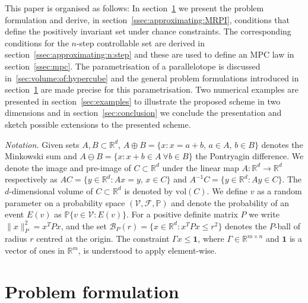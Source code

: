 \documentclass{ifacconf}
\providecommand{\vol}{\text{vol}}
\providecommand{\B}{\mathcal B}
\providecommand{\F}{\mathscr F}
\providecommand{\V}{\mathcal V}
\providecommand{\PP}{\mathbb P}
\providecommand{\RR}{\mathbb R}
\providecommand{\bfa}[1]{\mathbf{#1}}
\begin{document}
%
This paper is organised  as follows:
In section~\ref{sec:setup} we present the problem formulation and derive, in section~\ref{ssec:approximating:MRPI}, conditions that define the positively invariant set under chance constraints. The corresponding conditions for the $n$-step controllable set are derived in section~\ref{ssec:approximating:n:step} and these are used to define an MPC law in section~\ref{ssec:mpc}.
%
The parametrisation of a parallelotope is discussed in~\ref{sec:volume:of:hypercube} and the general problem formulations introduced in section~\ref{sec:setup} are made precise for this parametrisation.
%
Two numerical examples are presented in section~\ref{sec:examples} to illustrate the proposed scheme in two dimensions and in section~\ref{sec:conclusion} we conclude the presentation and sketch possible extensions to the presented scheme.

\textit{Notation.} Given sets $A,B\subset\RR^d$, $A\oplus B = \{x:x=a+b,\, a\in A,\, b\in B\}$ denotes the Minkowski sum and $A\ominus B = \{x: x+b \in A \ \forall b\in B\}$ the Pontryagin difference. We denote the image and pre-image of $C\subset\RR^d$ under the linear map $A:\RR^d\rightarrow\RR^d$ respectively as $AC = \{y\in\RR^d:Ax=y,\, x\in C\}$ and $A^{-1}C = \{y\in\RR^d:Ay\in C\}$. The $d$-dimensional volume of $C\subset\RR^d$ is denoted by $\vol(C)$. 
%
We define $v$ as a random parameter on a probability space $(\V,\F,\PP)$ and denote the probability of an event $E(v)$ as $\PP\{v\in\V : E(v)\}$.
%
For a positive definite matrix $P$ we write $\|x\|_P^2 = x^TPx$, and the set $\B_P(r) = \{x\in\RR^d:x^TPx\leq r^2\}$ denotes the $P$-ball of radius $r$ centred at the origin. The constraint $\Gamma x\leq \bfa{1}$, where $\Gamma\in\RR^{m\times n}$ and $\bfa{1}$ is a vector of ones in $\RR^m$, is understood to apply element-wise.


\section{Problem formulation}\label{sec:setup}
%
\end{document}
